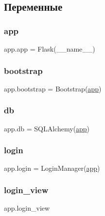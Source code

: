 \subsection{Переменные}
\mbox{\label{namespaceapp_a675b4ea702c13dc4b8c05f985a25b496}} 
\subsubsection{\texorpdfstring{app}{app}}
{\footnotesize\ttfamily app.\+app = Flask(\+\_\+\+\_\+name\+\_\+\+\_\+)}

\mbox{\label{namespaceapp_ab0100f0fe587f9be45118e0ab4c7dc32}} 
\subsubsection{\texorpdfstring{bootstrap}{bootstrap}}
{\footnotesize\ttfamily app.\+bootstrap = Bootstrap(\mbox{\hyperlink{namespaceapp_a675b4ea702c13dc4b8c05f985a25b496}{app}})}

\mbox{\label{namespaceapp_a75341a4bc0e8e239f299316136af3466}} 
\subsubsection{\texorpdfstring{db}{db}}
{\footnotesize\ttfamily app.\+db = S\+Q\+L\+Alchemy(\mbox{\hyperlink{namespaceapp_a675b4ea702c13dc4b8c05f985a25b496}{app}})}

\mbox{\label{namespaceapp_ab9cb25b758b83ccf851448416d009420}} 
\subsubsection{\texorpdfstring{login}{login}}
{\footnotesize\ttfamily app.\+login = Login\+Manager(\mbox{\hyperlink{namespaceapp_a675b4ea702c13dc4b8c05f985a25b496}{app}})}

\mbox{\label{namespaceapp_a0cbb607dd84c52fec23f2a56b7151163}} 
\subsubsection{\texorpdfstring{login\+\_\+view}{login\_view}}
{\footnotesize\ttfamily app.\+login\+\_\+view}

